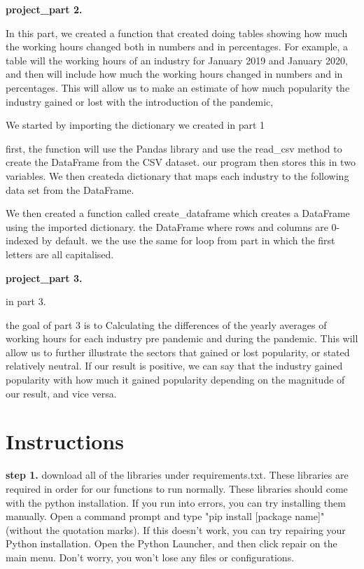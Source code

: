 \documentclass[fontsize=11pt]{article}
\begin{document}
\medskip 

\textbf{project\_part 2.}

In this part, we created a function that created doing tables showing how much the working hours changed both in numbers and in percentages. For example, a table will the working hours of an industry for January 2019 and January 2020, and then will include how much the working hours changed in numbers and in percentages. This will allow us to make an estimate of how much popularity the industry gained or lost with the introduction of the pandemic,

We started by importing the dictionary we created in part 1

first, the function will use the Pandas library and use the read\_csv method to create the DataFrame from the CSV dataset. our program then stores this in
two variables.
We then createda  dictionary that maps each industry to the following data set from the DataFrame.

We then created a function called create\_dataframe which creates a DataFrame using the imported dictionary. the DataFrame where rows and columns are 0-indexed by default. we the use the same for loop from part in which the first letters are all capitalised.





\medskip 

\textbf{project\_part 3.}

in part 3.

the goal of part 3 is to Calculating the differences of the yearly averages of working hours for each industry pre pandemic and during the pandemic. This will allow us to further illustrate the sectors that gained or lost popularity, or stated relatively neutral. If our result is positive, we can say that the industry gained popularity with how much it gained popularity depending on the magnitude of our result, and vice versa.
  

  
\section*{Instructions} 
 
\textbf{step 1.}
download all of the libraries under requirements.txt. These libraries are required in order for our functions to run normally. These libraries should come with the python installation. If you run into errors, you can try installing them manually. Open a command prompt and type "pip install [package name]" (without the quotation marks). If this doesn't work, you can try  repairing your Python installation. Open the Python Launcher, and then click repair on the main menu. Don't worry, you won't lose any files or configurations. \\
 
\end{document}
